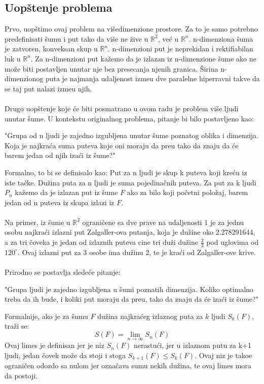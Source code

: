 \documentclass[11pt,letter]{article}
\begin{document}
\subsection[Uop\v stenje problema]{Uop\v stenje problema}
\bigskip
Prvo, uop\v stimo ovaj problem na vi\v sedimenzione prostore. Za to je samo potrebno predefinisati \v sumu i put tako da vi\v se ne \v zive u $\mathbb{R}^2$, ve\' c u $\mathbb{R}^n$.
\df n-dimenziona \v suma je zatvoren, konveksan skup u $\mathbb{R}^n$.
\df n-dimenzioni put je neprekidan i rektifiabilan luk u $\mathbb{R}^n$.
\df Za n-dimenzioni put ka\v zemo da je izlazan iz n-dimenzione \v sume ako ne mo\v ze biti postavljen unutar nje bez presecanja njenih granica.
\df \v Sirina n-dimenzionog puta je najmanja udaljenost izme\dj u dve paralelne hiperravni takve da se taj put nalazi izme\dj u njih.
\\
\smallskip
\\
\indent Drugo uop\v stenje koje \' ce biti posmatrano u ovom radu je problem vi\v se ljudi unutar \v sume. U kontekstu originalnog problema, pitanje bi bilo postavljeno kao:
\begin{center}
"Grupa od n ljudi je zajedno izgubljena unutar \v sume poznatog oblika i dimenzija. Koja je najkra\' ca suma puteva koje oni moraju da pre\dj u tako da znaju da \' ce barem jedan od njih iza\' ci iz \v sume?"
\end{center}
\indent Formalno, to bi se definisalo kao:
\df Put za n ljudi je skup k puteva koji kre\' cu iz iste ta\v cke.
\df Du\v zina puta za n ljudi je suma pojedina\v cnih puteva.
\df Za put za k ljudi $P_n$ ka\v zemo da je izlazan put iz \v sume $F$ ako za bilo koji po\v cetni polo\v zaj, barem jedan od n puteva iz skupa izlazi iz $F$.
\\
\smallskip
\\
Na primer, iz \v sume u $\mathbb{R}^2$ ograni\v cene sa dve prave na udaljenosti 1 je za jednu osobu najkra\' ci izlazni put Zalgaller-ova putanja, koja je du\v zine oko 2.278291644, a za tri \v coveka je jedan od izlaznih puteva cine tri du\v zi du\v zine $\frac{2}{3}$ pod uglovima od $120^\circ$. Ovaj izlazni put za 3 osobe ima du\v zinu 2, te je kra\' ci od Zalgaller-ove krive.
\\
\smallskip
\\
\indent Prirodno se postavlja slede\' ce pitanje:
\begin{center}
"Grupa ljudi je zajedno izgubljena u \v sumi poznatih dimenzija. Koliko optimalno treba da ih bude, i koliki put moraju da pre\dj u, tako da znaju da \' ce iza\' ci iz \v sume?"
\end{center}
Formalnije, ako je za \v sumu $F$ du\v zina najkra\' ceg izlaznog puta za $k$ ljudi $S_k(F)$, tra\v zi se:
$$S(F)=\lim_{n \to \infty} S_n(F)$$
Ovaj limes je definisan jer je niz $S_n(F)$ nerastu\' ci, jer u izlaznom putu za k+1 ljudi, jedan \v covek mo\v ze da stoji i stoga $S_{k+1}(F)\leqslant S_{k}(F)$. Ovaj niz je tako\dj e ograni\v cen odozdo sa nulom jer ozna\v cava sumu nekih du\v zina, te ovaj limes mora da postoji. 
\\
\end{document}
